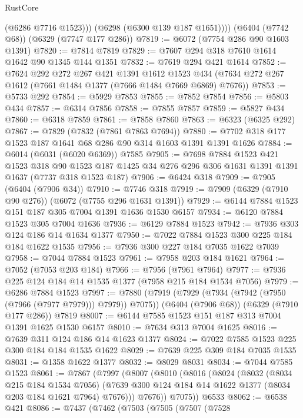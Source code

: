 \begin{lexlean}{RustCore}
\begin{coremodule}
{\begin{coremodule}
{{{{{{{{{{{{{{{{{{{{{{{{{{{{{{{{{{{{{{{{{{{{            (@6286 @7716 @1523)))
        (@6298 (@6300 @139 @187 @1651))))
    (@6404 (@7742 @68))
    (@6329 (@7747 @177 @286))
@7819 := @6072 (@7754 @286 @90 @1603 @1391)
@7820 := @7814 @7819
@7829 := @7607 @294 @318 @7610 @1614 @1642 @90 @1345 @144 @1351
@7832 := @7619 @294 @421 @1614
@7852 := @7624
    @292
    @272
    @267
    @421
    @1391
    @1612
    @1523
    @434
    (@7634 @272 @267 @1612 (@7661 @1484 @1377 (@7666 @1484 @7669 @6869) @7676))
@7853 := @5733 @292
@7854 := @5929 @7853
@7855 := @7852 @7854
@7856 := @5803 @434
@7857 := @6314 @7856
@7858 := @7855 @7857
@7859 := @5827 @434
@7860 := @6318 @7859
@7861 := @7858 @7860
@7863 := @6323 (@6325 @292)
@7867 := @7829 (@7832 (@7861 @7863 @7694))
@7880 := @7702 @318 @177 @1523 @187 @1641 @68 @286 @90 @314 @1603 @1391 @1391 @1626
@7884 := @6014 (@6031 (@6020 @6369)) @7585
@7905 := @7698
    @7884
    @1523
    @421
    @1523
    @318
    @90
    @1523
    @187
    @1425
    @34
    @276
    @296
    @306
    @1631
    @1391
    @1391
    @1637
    (@7737 @318 @1523 @187)
@7906 := @6424 @318
@7909 := @7905 (@6404 (@7906 @34))
@7910 := @7746 @318
@7919 := @7909 (@6329 (@7910 @90 @276)) (@6072 (@7755 @296 @1631 @1391))
@7929 := @6144 @7884 @1523 @151 @187 @305 @7004 @1391 @1636 @1530 @6157
@7934 := @6120 @7884 @1523 @305 @7004 @1636
@7936 := @6129 @7884 @1523
@7942 := @7936 @303 @124 @186 @14 @1634 @1377
@7950 := @7022 @7884 @1523 @300 @225 @184 @184 @1622 @1535
@7956 := @7936 @300 @227 @184 @7035 @1622 @7039
@7958 := @7044 @7884 @1523
@7961 := @7958 @203 @184 @1621
@7964 := @7052 (@7053 @203 @184)
@7966 := @7956 (@7961 @7964)
@7977 := @7936 @225 @124 @184 @14 @1535 @1377 (@7958 @215 @184 @1534 @7056)
@7979 := @6286 @7884 @1523
@7997 := @7880
    (@7919 (@7929 (@7934 (@7942 (@7950 (@7966 (@7977 @7979))) @7979)) @7075))
    (@6404 (@7906 @68))
    (@6329 (@7910 @177 @286))
    @7819
@8007 := @6144 @7585 @1523 @151 @187 @313 @7004 @1391 @1625 @1530 @6157
@8010 := @7634 @313 @7004 @1625
@8016 := @7639 @311 @124 @186 @14 @1623 @1377
@8024 := @7022 @7585 @1523 @225 @300 @184 @184 @1535 @1622
@8029 := @7639 @225 @309 @184 @7035 @1535
@8031 := @1358 @1622 @1377
@8032 := @8029 @8031
@8034 := @7044 @7585 @1523
@8061 := @7867
    (@7997
      (@8007
        (@8010
          (@8016
            (@8024
              (@8032
                (@8034 @215 @184 @1534 @7056)
                (@7639 @300 @124 @184 @14 @1622 @1377 (@8034 @203 @184 @1621 @7964) @7676)))
            @7676))
        @7075))
    @6533
@8062 := @6538 @421
@8086 := @7437
    (@7462
      (@7503
        (@7505
          (@7507
            (@7528
}}}}}}}}}}}}}}}}}}}}}}}}}}}}}}}}}}}}}}}}}}}}
\end{coremodule}}
\end{coremodule}
\end{lexlean}
